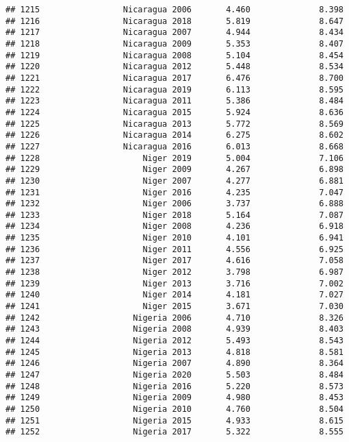 \documentclass[
]{article}
\begin{document}
\begin{verbatim}
## 1215                 Nicaragua 2006       4.460              8.398
## 1216                 Nicaragua 2018       5.819              8.647
## 1217                 Nicaragua 2007       4.944              8.434
## 1218                 Nicaragua 2009       5.353              8.407
## 1219                 Nicaragua 2008       5.104              8.454
## 1220                 Nicaragua 2012       5.448              8.534
## 1221                 Nicaragua 2017       6.476              8.700
## 1222                 Nicaragua 2019       6.113              8.595
## 1223                 Nicaragua 2011       5.386              8.484
## 1224                 Nicaragua 2015       5.924              8.636
## 1225                 Nicaragua 2013       5.772              8.569
## 1226                 Nicaragua 2014       6.275              8.602
## 1227                 Nicaragua 2016       6.013              8.668
## 1228                     Niger 2019       5.004              7.106
## 1229                     Niger 2009       4.267              6.898
## 1230                     Niger 2007       4.277              6.881
## 1231                     Niger 2016       4.235              7.047
## 1232                     Niger 2006       3.737              6.888
## 1233                     Niger 2018       5.164              7.087
## 1234                     Niger 2008       4.236              6.918
## 1235                     Niger 2010       4.101              6.941
## 1236                     Niger 2011       4.556              6.925
## 1237                     Niger 2017       4.616              7.058
## 1238                     Niger 2012       3.798              6.987
## 1239                     Niger 2013       3.716              7.002
## 1240                     Niger 2014       4.181              7.027
## 1241                     Niger 2015       3.671              7.030
## 1242                   Nigeria 2006       4.710              8.326
## 1243                   Nigeria 2008       4.939              8.403
## 1244                   Nigeria 2012       5.493              8.543
## 1245                   Nigeria 2013       4.818              8.581
## 1246                   Nigeria 2007       4.890              8.364
## 1247                   Nigeria 2020       5.503              8.484
## 1248                   Nigeria 2016       5.220              8.573
## 1249                   Nigeria 2009       4.980              8.453
## 1250                   Nigeria 2010       4.760              8.504
## 1251                   Nigeria 2015       4.933              8.615
## 1252                   Nigeria 2017       5.322              8.555

\end{verbatim}
\end{document}
